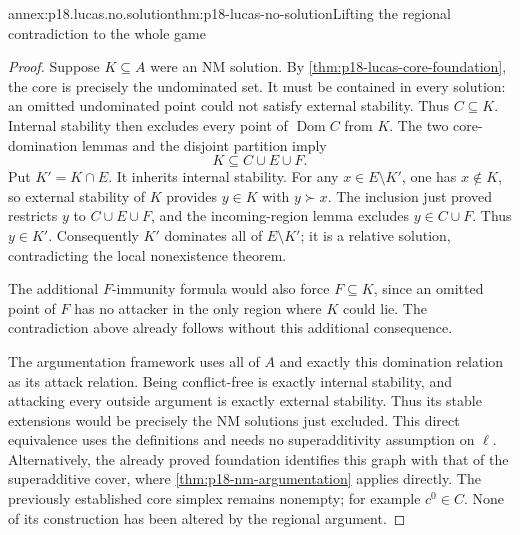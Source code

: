 \begin{annexitem}{annex:p18.lucas.no.solution}{thm:p18-lucas-no-solution}{Lifting the regional contradiction to the whole game}
\begin{proof}
Suppose \(K\subseteq A\) were an NM solution.
By \cref{thm:p18-lucas-core-foundation}, the core is precisely
the undominated set. It must be
contained in every solution: an omitted undominated point
could not satisfy external stability. Thus \(C\subseteq K\).
Internal stability then excludes every point of
\(\operatorname{Dom}C\) from \(K\). The two core-domination
lemmas and the disjoint partition imply
\[
                                         K\subseteq C\cup E\cup F.
\]
Put \(K'=K\cap E\). It inherits internal stability.
For any \(x\in E\setminus K'\), one has \(x\notin K\), so
external stability of \(K\) provides \(y\in K\) with
\(y\succ x\). The inclusion just proved restricts \(y\)
to \(C\cup E\cup F\), and the incoming-region lemma excludes
\(y\in C\cup F\). Thus \(y\in K'\).
Consequently \(K'\) dominates all of \(E\setminus K'\);
it is a relative solution, contradicting the local
nonexistence theorem.

The additional \(F\)-immunity formula would also force
\(F\subseteq K\), since an omitted point of \(F\) has no
attacker in the only region where \(K\) could lie.
The contradiction above already follows without this
additional consequence.

The argumentation framework uses all of \(A\) and exactly
this domination relation as its attack relation.
Being conflict-free is exactly internal stability, and
attacking every outside argument is exactly external
stability. Thus its stable extensions would be precisely
the NM solutions just excluded. This direct equivalence
uses the definitions and needs no superadditivity assumption
on \(\ell\). Alternatively, the already proved foundation
identifies this graph with that of the superadditive cover,
where \cref{thm:p18-nm-argumentation} applies directly.
The previously established core simplex remains nonempty;
for example \(c^0\in C\). None of its construction has
been altered by the regional argument.
\end{proof}
\end{annexitem}

